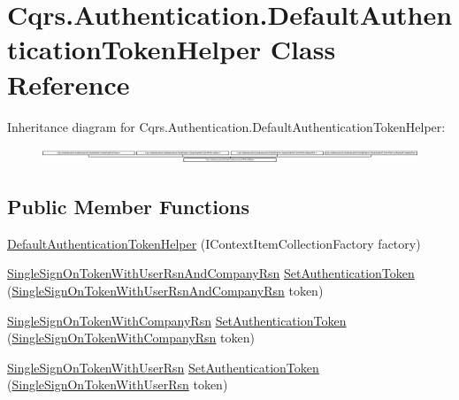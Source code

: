 \hypertarget{classCqrs_1_1Authentication_1_1DefaultAuthenticationTokenHelper}{}\section{Cqrs.\+Authentication.\+Default\+Authentication\+Token\+Helper Class Reference}
\label{classCqrs_1_1Authentication_1_1DefaultAuthenticationTokenHelper}
Inheritance diagram for Cqrs.\+Authentication.\+Default\+Authentication\+Token\+Helper\+:\begin{figure}[H]
\begin{center}
\leavevmode
\includegraphics[height=0.472973cm]{classCqrs_1_1Authentication_1_1DefaultAuthenticationTokenHelper}
\end{center}
\end{figure}
\subsection*{Public Member Functions}
\begin{DoxyCompactItemize}
\item 
\hyperlink{classCqrs_1_1Authentication_1_1DefaultAuthenticationTokenHelper_a21bfae37d24b180797211396a0348526_a21bfae37d24b180797211396a0348526}{Default\+Authentication\+Token\+Helper} (I\+Context\+Item\+Collection\+Factory factory)
\item 
\hyperlink{classCqrs_1_1Authentication_1_1SingleSignOnTokenWithUserRsnAndCompanyRsn}{Single\+Sign\+On\+Token\+With\+User\+Rsn\+And\+Company\+Rsn} \hyperlink{classCqrs_1_1Authentication_1_1DefaultAuthenticationTokenHelper_ab06712f60b8afc6819b5372e3a21e13a_ab06712f60b8afc6819b5372e3a21e13a}{Set\+Authentication\+Token} (\hyperlink{classCqrs_1_1Authentication_1_1SingleSignOnTokenWithUserRsnAndCompanyRsn}{Single\+Sign\+On\+Token\+With\+User\+Rsn\+And\+Company\+Rsn} token)
\item 
\hyperlink{classCqrs_1_1Authentication_1_1SingleSignOnTokenWithCompanyRsn}{Single\+Sign\+On\+Token\+With\+Company\+Rsn} \hyperlink{classCqrs_1_1Authentication_1_1DefaultAuthenticationTokenHelper_a2ae21fb09555d3ab5119f9ea4c69b202_a2ae21fb09555d3ab5119f9ea4c69b202}{Set\+Authentication\+Token} (\hyperlink{classCqrs_1_1Authentication_1_1SingleSignOnTokenWithCompanyRsn}{Single\+Sign\+On\+Token\+With\+Company\+Rsn} token)
\item 
\hyperlink{classCqrs_1_1Authentication_1_1SingleSignOnTokenWithUserRsn}{Single\+Sign\+On\+Token\+With\+User\+Rsn} \hyperlink{classCqrs_1_1Authentication_1_1DefaultAuthenticationTokenHelper_a57d015883b278136590894a3885d246c_a57d015883b278136590894a3885d246c}{Set\+Authentication\+Token} (\hyperlink{classCqrs_1_1Authentication_1_1SingleSignOnTokenWithUserRsn}{Single\+Sign\+On\+Token\+With\+User\+Rsn} token)
\end{DoxyCompactItemize}


